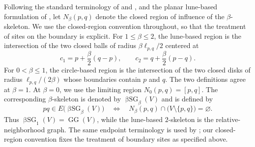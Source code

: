 \documentclass[a4paper,fleqn]{cas-sc}
\theoremstyle{definition}
\theoremstyle{remark}
\newcommand{\ellpq}{\ell_{p,q}}
\newcommand{\0}{\mathbf{0}}
\DeclareMathOperator{\BSG}{\beta SG}
\DeclareMathOperator{\GG}{GG}
\begin{document}
Following the standard terminology of
\citet[Sec.~II-C]{jaromczyk1992relative} and
\citet[Sec.~2]{eppstein2002beta}, and the planar lune-based formulation of
\citet[Def.~1]{maravillo2023cyclic}, let $N_\beta(p,q)$ denote the closed
region of influence of the $\beta$-skeleton. We use the closed-region
convention throughout, so that the treatment of sites on the boundary is
explicit. For
$1\leq\beta\leq2$, the lune-based region is the intersection of the two
closed balls of radius $\beta\ellpq/2$ centered at
\begin{equation}
    c_1=p+\frac{\beta}{2}(q-p),
    \qquad
    c_2=q+\frac{\beta}{2}(p-q).
\end{equation}
For $0<\beta\leq1$, the circle-based region is the intersection of the
two closed disks of radius $\ellpq/(2\beta)$ whose boundaries contain
$p$ and $q$.  The two definitions agree at $\beta=1$.  At $\beta=0$,
we use the limiting region $N_0(p,q)=[p,q]$.  The corresponding
$\beta$-skeleton is denoted by $\BSG_\beta(V)$ and is defined by
\begin{equation}\label{eq:beta-skeleton-definition}
    pq\in E\bigl(\BSG_\beta(V)\bigr)
    \quad\Longleftrightarrow\quad
    N_\beta(p,q)\cap\bigl(V\setminus\{p,q\}\bigr)=\varnothing.
\end{equation}
Thus $\BSG_1(V)=\GG(V)$, while the lune-based $2$-skeleton is the
relative-neighborhood graph. The same endpoint terminology is used by
\citet[Def.~1]{maravillo2023cyclic}; our closed-region convention fixes the
treatment of boundary sites as specified above.
\end{document}
